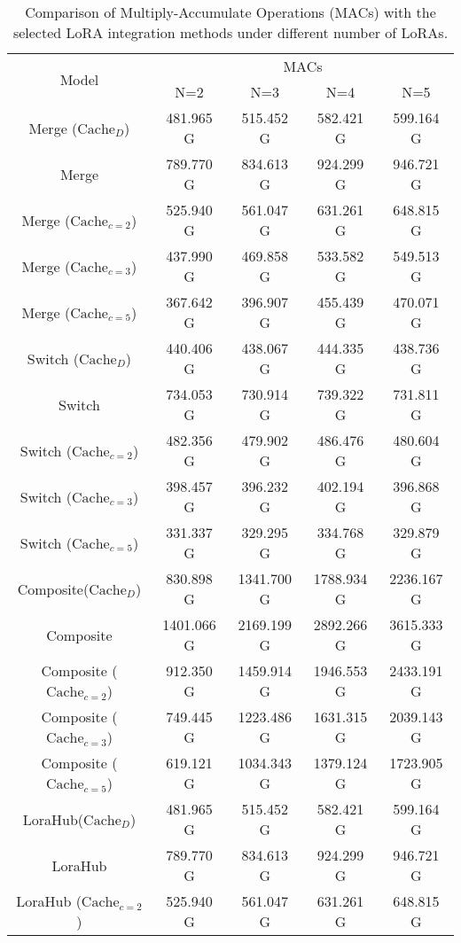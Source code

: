 \begin{table}[H]
\caption{Comparison of Multiply-Accumulate Operations (MACs) with the selected LoRA integration methods under different number of LoRAs.}
\label{cachefull}
\begin{center}
\begin{tabular}{c|cccc}
\toprule
\multirow{2}{*}{Model} & \multicolumn{4}{c}{MACs} \\
\cmidrule(lr){2-5}
& N=2 & N=3 & N=4 & N=5 \\
\midrule
Merge ($\text{Cache}_{D}$) & 481.965 G  & 515.452 G  & 582.421 G  & 599.164 G \\
Merge  & 789.770 G  & 834.613 G  & 924.299 G & 946.721 G  \\
Merge ($\text{Cache}_{c=2}$) & 525.940 G  & 561.047 G & 631.261 G  & 648.815 G \\
Merge ($\text{Cache}_{c=3}$) & 437.990 G  & 469.858 G  & 533.582 G & 549.513 G  \\
Merge ($\text{Cache}_{c=5}$) & 367.642 G  & 396.907 G  & 455.439 G  & 470.071 G  \\
Switch ($\text{Cache}_{D}$) & 440.406 G  & 438.067 G  & 444.335 G  & 438.736 G  \\
Switch & 734.053 G  & 730.914 G  & 739.322 G  & 731.811 G  \\
Switch ($\text{Cache}_{c=2}$)& 482.356 G  & 479.902 G  & 486.476 G  & 480.604 G \\
Switch ($\text{Cache}_{c=3}$)& 398.457 G  & 396.232 G  & 402.194 G  & 396.868 G \\
Switch ($\text{Cache}_{c=5}$)& 331.337 G  & 329.295 G  & 334.768 G  & 329.879 G \\
Composite($\text{Cache}_{D}$) & 830.898 G  & 1341.700 G  & 1788.934 G & 2236.167 G \\
Composite & 1401.066 G & 2169.199 G  & 2892.266 G & 3615.333 G \\
Composite ($\text{Cache}_{c=2}$)& 912.350 G  & 1459.914 G  & 1946.553 G & 2433.191 G  \\
Composite ($\text{Cache}_{c=3}$)& 749.445 G  & 1223.486 G  & 1631.315 G & 2039.143 G  \\
Composite ($\text{Cache}_{c=5}$)& 619.121 G  & 1034.343 G  & 1379.124 G & 1723.905 G  \\
LoraHub($\text{Cache}_{D}$) & 481.965 G  & 515.452 G  & 582.421 G  & 599.164 G  \\
LoraHub & 789.770 G  & 834.613 G  & 924.299 G  & 946.721 G  \\
LoraHub ($\text{Cache}_{c=2}$) & 525.940 G  & 561.047 G  & 631.261 G  & 648.815 G  \\

\end{tabular}
\end{center}
\end{table}

